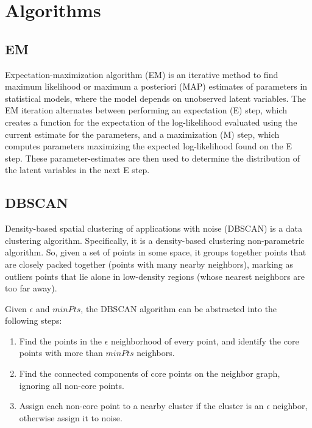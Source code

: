 \section{Algorithms}
\subsection{EM}
Expectation-maximization algorithm (EM) \cite{em,wiki_em} is an iterative method to find maximum likelihood or maximum a posteriori (MAP) estimates of parameters in statistical models, where the model depends on unobserved latent variables. The EM iteration alternates between performing an expectation (E) step, which creates a function for the expectation of the log-likelihood evaluated using the current estimate for the parameters, and a maximization (M) step, which computes parameters maximizing the expected log-likelihood found on the E step. These parameter-estimates are then used to determine the distribution of the latent variables in the next E step.

\subsection{DBSCAN}
Density-based spatial clustering of applications with noise (DBSCAN) is a data clustering algorithm. Specifically, it is a density-based clustering non-parametric algorithm. So, given a set of points in some space, it groups together points that are closely packed together (points with many nearby neighbors), marking as outliers points that lie alone in low-density regions (whose nearest neighbors are too far away).

Given $\epsilon$ and $minPts$, the DBSCAN algorithm can be abstracted into the following steps:
\begin{enumerate}
    \item Find the points in the $\epsilon$ neighborhood of every point, and identify the core points with more than $minPts$ neighbors.
    \item Find the connected components of core points on the neighbor graph, ignoring all non-core points.
    \item Assign each non-core point to a nearby cluster if the cluster is an  $\epsilon$ neighbor, otherwise assign it to noise.
\end{enumerate}